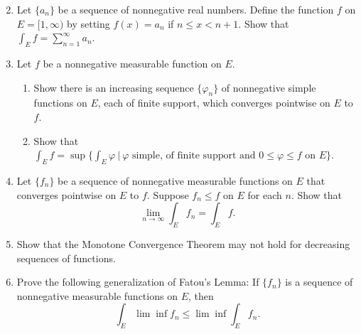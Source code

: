 \begin{enumerate}
\[    \]
    \item Let $\{a_n\}$ be a sequence of nonnegative real numbers. Define the function $f$ on $E=[1,\infty)$ by setting $f(x)=a_n$ if $n\le x<n+1$. Show that $\int_Ef=\sum_{n=1}^\infty a_n$.
    \item Let $f$ be a nonnegative measurable function on $E$.
    \begin{enumerate}[label=(\roman*),align=left]
        \item Show there is an increasing sequence $\{\varphi_n\}$ of nonnegative simple functions on $E$, each of finite support, which converges pointwise on $E$ to $f$.
        \item Show that $\int_Ef=\sup\{\int_E\varphi\ |\ \varphi\text{ simple, of finite support and }0\le\varphi\le f\text{ on }E\}$.
    \end{enumerate}
    \item Let $\{f_n\}$ be a sequence of nonnegative measurable functions on $E$ that converges pointwise on $E$ to $f$. Suppose $f_n\le f$ on $E$ for each $n$. Show that
    \[
        \lim_{n\to\infty}\int_Ef_n=\int_Ef.
    \]
    \item Show that the Monotone Convergence Theorem may not hold for decreasing sequences of functions.
    \item Prove the following generalization of Fatou's Lemma: If $\{f_n\}$ is a sequence of nonnegative measurable functions on $E$, then 
    \[
    \int_E\lim\inf f_n\le\lim\inf\int_Ef_n.     
    \]
\end{enumerate}
    
